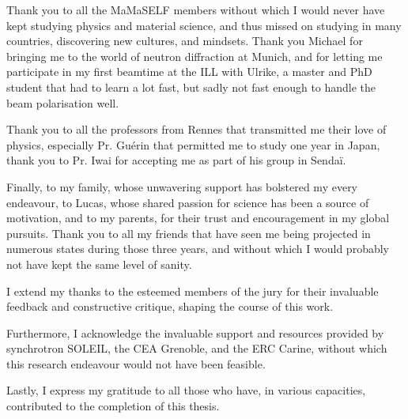 Thank you to all the MaMaSELF members without which I would never have kept studying physics and material science, and thus missed on studying in many countries, discovering new cultures, and mindsets.
Thank you Michael for bringing me to the world of neutron diffraction at Munich, and for letting me participate in my first beamtime at the ILL with Ulrike, a master and PhD student that had to learn a lot fast, but sadly not fast enough to handle the beam polarisation well.

Thank you to all the professors from Rennes that transmitted me their love of physics, especially Pr. Guérin that permitted me to study one year in Japan, thank you to Pr. Iwai for accepting me as part of his group in Sendaï.

Finally, to my family, whose unwavering support has bolstered my every endeavour, to Lucas, whose shared passion for science has been a source of motivation, and to my parents, for their trust and encouragement in my global pursuits.
Thank you to all my friends that have seen me being projected in numerous states during those three years, and without which I would probably not have kept the same level of sanity.

I extend my thanks to the esteemed members of the jury for their invaluable feedback and constructive critique, shaping the course of this work.

Furthermore, I acknowledge the invaluable support and resources provided by synchrotron SOLEIL, the CEA Grenoble, and the ERC Carine, without which this research endeavour would not have been feasible.

Lastly, I express my gratitude to all those who have, in various capacities, contributed to the completion of this thesis.

\vspace{\fill} %

\newpage\thispagestyle{empty}\null\newpage